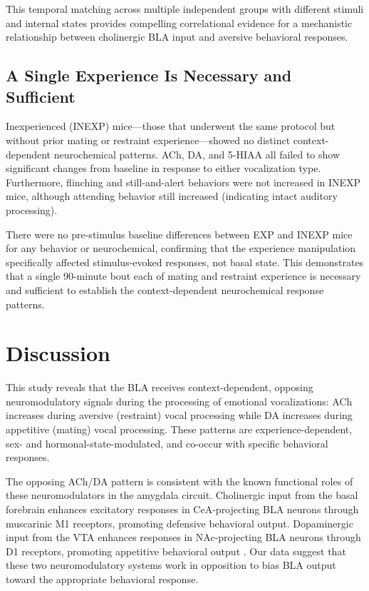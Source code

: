\documentclass[11pt]{article}
\begin{document}
This temporal matching across multiple independent groups with different stimuli and internal states provides compelling correlational evidence for a mechanistic relationship between cholinergic BLA input and aversive behavioral responses.

\subsection{A Single Experience Is Necessary and Sufficient}

Inexperienced (INEXP) mice---those that underwent the same protocol but without prior mating or restraint experience---showed no distinct context-dependent neurochemical patterns. ACh, DA, and 5-HIAA all failed to show significant changes from baseline in response to either vocalization type. Furthermore, flinching and still-and-alert behaviors were not increased in INEXP mice, although attending behavior still increased (indicating intact auditory processing).

There were no pre-stimulus baseline differences between EXP and INEXP mice for any behavior or neurochemical, confirming that the experience manipulation specifically affected stimulus-evoked responses, not basal state. This demonstrates that a single 90-minute bout each of mating and restraint experience is necessary and sufficient to establish the context-dependent neurochemical response patterns.

\section{Discussion}

This study reveals that the BLA receives context-dependent, opposing neuromodulatory signals during the processing of emotional vocalizations: ACh increases during aversive (restraint) vocal processing while DA increases during appetitive (mating) vocal processing. These patterns are experience-dependent, sex- and hormonal-state-modulated, and co-occur with specific behavioral responses.

The opposing ACh/DA pattern is consistent with the known functional roles of these neuromodulators in the amygdala circuit. Cholinergic input from the basal forebrain \citep{ballinger2016basal} enhances excitatory responses in CeA-projecting BLA neurons through muscarinic M1 receptors, promoting defensive behavioral output. Dopaminergic input from the VTA \citep{schultz2007multiple} enhances responses in NAc-projecting BLA neurons through D1 receptors, promoting appetitive behavioral output \citep{beyeler2016divergent}. Our data suggest that these two neuromodulatory systems work in opposition to bias BLA output toward the appropriate behavioral response.
\end{document}
